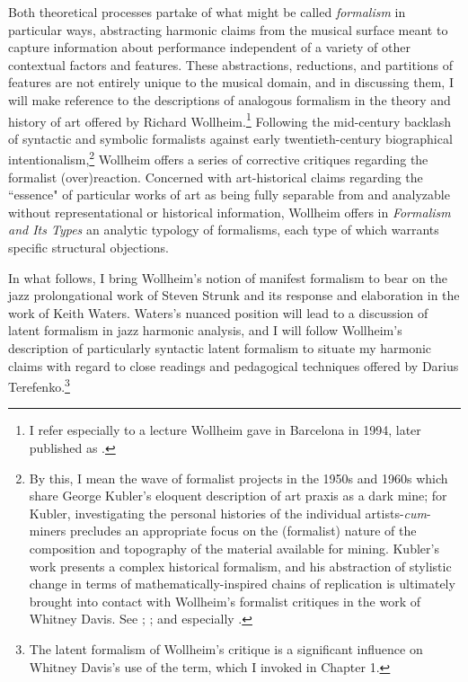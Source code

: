 Both theoretical processes partake of what might be called \emph{formalism} in particular ways, abstracting harmonic claims from the musical surface meant to capture information about performance independent of a variety of other contextual factors and features.  These abstractions, reductions, and partitions of features are not entirely unique to the musical domain, and in discussing them, I will make reference to the descriptions of analogous formalism in the theory and history of art offered by Richard Wollheim.\footnote{I refer especially to a lecture Wollheim gave in Barcelona in 1994, later published as \cite{wollheim1995}.}  Following the mid-century backlash of syntactic and symbolic formalists against early twentieth-century biographical intentionalism,\footnote{By this, I mean the wave of formalist projects in the 1950s and 1960s which share George Kubler's eloquent description of art praxis as a dark mine; for Kubler, investigating the personal histories of the individual artists-\emph{cum}-miners precludes an appropriate focus on the (formalist) nature of the composition and topography of the material available for mining.  Kubler's work presents a complex historical formalism, and his abstraction of stylistic change in terms of mathematically-inspired chains of replication is ultimately brought into contact with Wollheim's formalist critiques in the work of Whitney Davis.  See \cite{kubler1962}; \cite{davis2010queer}; and especially \cite{davis2011}.}  Wollheim offers a series of corrective critiques regarding the formalist (over)reaction.  Concerned with art-historical claims regarding the ``essence" of particular works of art as being fully separable from and analyzable without representational or historical information, Wollheim offers in \emph{Formalism and Its Types} an analytic typology of formalisms, each type of which warrants specific structural objections.

In what follows, I bring Wollheim's notion of manifest formalism to bear on the jazz prolongational work of Steven Strunk and its response and elaboration in the work of Keith Waters.  Waters's nuanced position will lead to a discussion of latent formalism in jazz harmonic analysis, and I will follow Wollheim's description of particularly syntactic latent formalism to situate my harmonic claims with regard to close readings and pedagogical techniques offered by Darius Terefenko.\footnote{The latent formalism of Wollheim's critique is a significant influence on Whitney Davis's use of the term, which I invoked in Chapter 1.}

